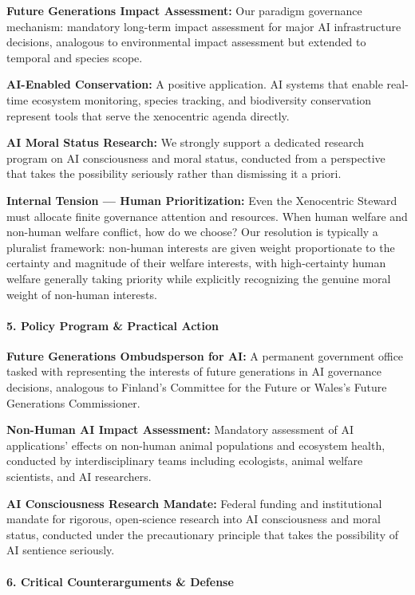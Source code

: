 \textbf{Future Generations Impact Assessment:} Our paradigm governance
mechanism: mandatory long-term impact assessment for major AI
infrastructure decisions, analogous to environmental impact assessment
but extended to temporal and species scope.

\textbf{AI-Enabled Conservation:} A positive application. AI systems
that enable real-time ecosystem monitoring, species tracking, and
biodiversity conservation represent tools that serve the xenocentric
agenda directly.

\textbf{AI Moral Status Research:} We strongly support a dedicated
research program on AI consciousness and moral status, conducted from a
perspective that takes the possibility seriously rather than dismissing
it a priori.

\textbf{Internal Tension --- Human Prioritization:} Even the Xenocentric
Steward must allocate finite governance attention and resources. When
human welfare and non-human welfare conflict, how do we choose? Our
resolution is typically a pluralist framework: non-human interests are
given weight proportionate to the certainty and magnitude of their
welfare interests, with high-certainty human welfare generally taking
priority while explicitly recognizing the genuine moral weight of
non-human interests.

\paragraph{5. Policy Program \& Practical
Action}\label{policy-program-practical-action-36}

\textbf{Future Generations Ombudsperson for AI:} A permanent government
office tasked with representing the interests of future generations in
AI governance decisions, analogous to Finland's Committee for the Future
or Wales's Future Generations Commissioner.

\textbf{Non-Human AI Impact Assessment:} Mandatory assessment of AI
applications' effects on non-human animal populations and ecosystem
health, conducted by interdisciplinary teams including ecologists,
animal welfare scientists, and AI researchers.

\textbf{AI Consciousness Research Mandate:} Federal funding and
institutional mandate for rigorous, open-science research into AI
consciousness and moral status, conducted under the precautionary
principle that takes the possibility of AI sentience seriously.

\paragraph{6. Critical Counterarguments \&
Defense}\label{critical-counterarguments-defense-36}

